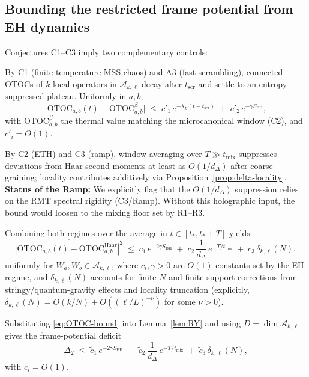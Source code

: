 \documentclass[aps,prd,preprint,onecolumn,superscriptaddress,nofootinbib,longbibliography,floatfix,11pt,showpacs,showkeys]{revtex4-2}
\theoremstyle{plain}
\theoremstyle{definition}
\theoremstyle{remark}
\begin{document}
\subsection*{Bounding the restricted frame potential from EH dynamics}
Conjectures C1--C3 imply two complementary controls:
\begin{description}[leftmargin=*,itemsep=0.3em]
  \item[(Early-to-intermediate times, $t_\ast\lesssim t\ll t_{\mathrm{Th}}$)] By C1 (finite-temperature MSS chaos) and A3 (fast scrambling), connected OTOCs of $k$-local operators in $\mathscr{A}_{k,\ell}$ decay after $t_{\mathrm{scr}}$ and settle to an entropy-suppressed plateau.
Uniformly in $a,b$,
  \[
    \big| \mathrm{OTOC}_{a,b}(t) - \mathrm{OTOC}^{\beta}_{a,b} \big| \;\le\; c'_1\, e^{-\lambda_L (t-t_{\mathrm{scr}})} \;+\; c'_2\, e^{-\gamma S_{\mathrm{BH}}}\!,
  \]
  with $\mathrm{OTOC}^{\beta}_{a,b}$ the thermal value matching the microcanonical window (C2), and $c'_i=O(1)$.
  \item[(Late times, $t\gtrsim t_{\mathrm{Th}}$)] By C2 (ETH) and C3 (ramp), window-averaging over $T\gg t_{\mathrm{mix}}$ suppresses deviations from Haar second moments at least as $O(1/d_\Delta)$ after coarse-graining; locality contributes additively via Proposition~\ref{prop:delta-locality}.
\textbf{Status of the Ramp:} We explicitly flag that the $O(1/d_\Delta)$ suppression relies on the RMT spectral rigidity (C3/Ramp). Without this holographic input, the bound would loosen to the mixing floor set by R1--R3.
\end{description}
Combining both regimes over the average in $t\in[t_\ast,t_\ast+T]$ yields:
\begin{equation}\label{eq:OTOC-bound}
 \overline{\left| \mathrm{OTOC}_{a,b}(t) - \mathrm{OTOC}^{\mathrm{Haar}}_{a,b} \right|^2}
 \;\le\; c_1\, e^{-2\gamma S_{\mathrm{BH}}} \;+\; c_2\, \frac{1}{d_\Delta}\, e^{-T/t_{\mathrm{mix}}}
 \;+\; c_3\, \delta_{k,\ell}(N),
\end{equation}
uniformly for $W_a,W_b\in\mathscr{A}_{k,\ell}$, where $c_i,\gamma>0$ are $O(1)$ constants set by the EH regime, and $\delta_{k,\ell}(N)$ accounts for finite-$N$ and finite-support corrections from stringy/quantum-gravity effects and locality truncation (explicitly, $\delta_{k,\ell}(N)=O(k/N)+O((\ell/L)^{-\nu})$ for some $\nu>0$).

Substituting \eqref{eq:OTOC-bound} into Lemma~\ref{lem:RY} and using $D=\dim \mathscr{A}_{k,\ell}$ gives the frame-potential deficit
\begin{equation}\label{eq:Delta2-bound}
 \Delta_2 \;\le\; \tilde c_1\, e^{-2\gamma S_{\mathrm{BH}}}
 \;+\; \tilde c_2\, \frac{1}{d_\Delta}\, e^{-T/t_{\mathrm{mix}}}
 \;+\; \tilde c_3\, \delta_{k,\ell}(N),
\end{equation}
with $\tilde c_i=O(1)$.
\end{document}
